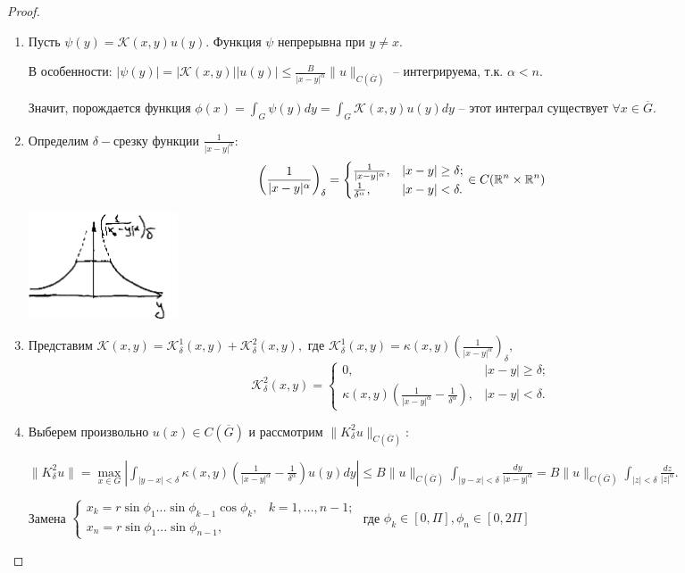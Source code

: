 \begin{proof} $\ $
\begin{enumerate}
\item{
Пусть $\psi(y) = \mathcal{K}(x,y)u(y).$ Функция $\psi$ непрерывна при $y \ne x.$

В особенности: $|\psi(y)| = |\mathcal{K}(x,y)||u(y)| \le \frac{B}{|x-y|^\alpha} \|u\|_{C(\overline{G})}$ -- интегрируема, т.к. $\alpha < n.$

Значит, порождается функция $\phi(x) = \int_G\psi(y)dy = \int_G \mathcal{K}(x,y)u(y)dy$ -- этот интеграл существует $\forall x \in \overline{G}.$
}

\item{Определим $\delta-$срезку функции $\frac{1}{|x-y|^\alpha}:$ $$\left(\frac{1}{|x-y|^\alpha}\right)_\delta = \begin{cases}
   \frac{1}{|x-y|^\alpha}, &|x-y|\ge \delta;\\
   \frac{1}{\delta^\alpha}, & |x-y|<\delta.
 \end{cases} \in C (\mathbb{R}^n \times \mathbb{R}^n)$$
}
\begin{center}
\includegraphics[width=0.2\textwidth]{26_1_new}
\end{center}

\item{Представим $\mathcal{K}(x,y) = \mathcal{K}^1_\delta (x,y) + \mathcal{K}^2_\delta(x,y),$ где $\mathcal{K}^1_\delta (x,y) = \kappa(x,y)(\frac{1}{|x-y|^\alpha})_\delta,$ $$\mathcal{K}^2_\delta(x,y) = \begin{cases}
   0, &|x-y|\ge \delta;\\
   \kappa(x,y)(\frac{1}{|x-y|^\alpha}-\frac{1}{\delta^\alpha}), & |x-y|<\delta.
 \end{cases}$$
}

\item{ Выберем произвольно $u(x) \in C(\overline{G})$ и рассмотрим $\|K^2_\delta u\|_{C(\overline{G})}$: 

$\|K^2_\delta u\| = \max\limits_{x \in G} |\int_{|y-x|<\delta}\kappa(x,y)(\frac{1}{|x-y|^\alpha}-\frac{1}{\delta^\alpha})u(y)dy| \le B\|u\|_{C(\overline{G})}\int_{|y-x|<\delta}\frac{dy}{|x-y|^\alpha} = B \|u\|_{C(\overline{G})}\int_{|z|<\delta}\frac{dz}{|z|^\alpha}.
$

Замена $\begin{cases}
   x_k = r\sin\phi_1...\sin\phi_{k-1}\cos\phi_k, &k = 1, \dots, n-1;\\
   x_n = r\sin\phi_1...\sin\phi_{n-1},
 \end{cases}$ где $\phi_k \in [0, \Pi], \phi_n \in [0, 2\Pi]$
 
}
\end{enumerate}
\end{proof}
